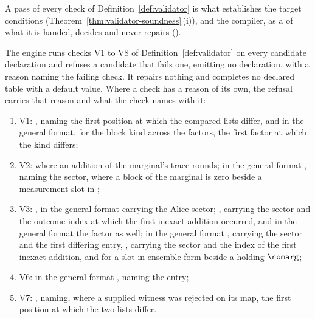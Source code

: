 
A pass of every check of Definition~\ref{def:validator} is what establishes
the target conditions (Theorem~\ref{thm:validator-soundness}\,(i)), and the compiler, as a
 of what it is handed, decides and never repairs
().

\begin{requirement}\label{req:validator-refusals}
The engine runs checks V1 to V8 of Definition~\ref{def:validator} on every
candidate declaration and refuses a candidate that fails one, emitting no
declaration, with a reason naming the failing check. It repairs nothing and completes no declared table with a default
value. Where a check has a reason of its own, the refusal carries that reason
and what the check names with it:
\begin{enumerate}[label=(\roman*),leftmargin=2.2em]
\item V1: , naming the first position at which the
  compared lists differ, and in the general format, for the block kind across
  the factors, the first factor at which the kind differs;
\item V2:  where an addition of the
  marginal's trace rounds; in the general format
  , naming the sector, where a block of the
  marginal is zero beside a measurement slot in ;
\item V3: , in the general format carrying
  the Alice sector; , carrying the sector and
  the outcome index at which the first inexact addition occurred, and in the
  general format the factor as well; in the general format
  , carrying the sector and the first
  differing entry, , carrying the sector and
  the index of the first inexact addition, and
   for a slot in ensemble form beside a
   holding $\nomarg$;
\item V6: in the general format ,
  naming the entry;
\item V7: , naming, where a supplied witness was
  rejected on its map, the first position at which the two lists differ.
\end{enumerate}
\end{requirement}
